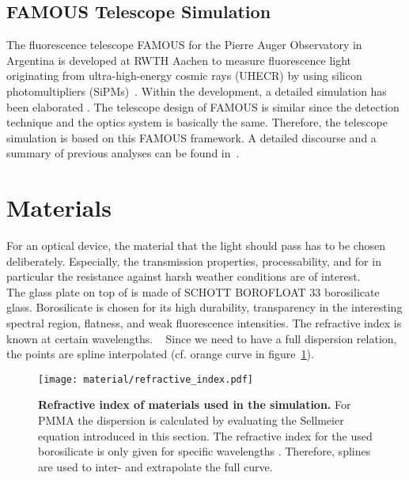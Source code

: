 \subsection{FAMOUS Telescope Simulation}\label{sec:famous_simulation}

The fluorescence telescope FAMOUS for the Pierre Auger Observatory in Argentina is developed at RWTH Aachen to measure fluorescence light originating from ultra-high-energy cosmic rays (UHECR) by using silicon photomultipliers (SiPMs)~\cite{famous:bretz}. Within the development, a detailed \geant simulation has been elaborated \cite{famous:sim_github,famous:sim_github}. The telescope design of FAMOUS is similar since the detection technique and the optics system is basically the same. Therefore, the \iceact telescope simulation is based on this FAMOUS \geant framework. A detailed discourse and a summary of previous analyses can be found in~\cite{famous:niggemann}.

\section{Materials}\label{sec:iceact:model:material}

For an optical device, the material that the light should pass has to be chosen deliberately. Especially, the transmission properties, processability, and for \iceact in particular the resistance against harsh weather conditions are of interest.\\

The glass plate on top of \iceact is made of SCHOTT BOROFLOAT\textsuperscript{\textregistered} 33 borosilicate glass. Borosilicate is chosen for its high durability, transparency in the interesting spectral region, flatness, and weak fluorescence intensities. The refractive index is known at certain wavelengths. ~\cite{iceact:borosilicate:datasheet} Since we need to have a full dispersion relation, the points are spline interpolated (cf. orange curve in figure~\ref{iceact:model:material:refractive_index}).\\

\begin{figure}[H]
	\centering
	\texttt{[image: material/refractive\_index.pdf]}
	\caption[Refractive index of used materials]{\textbf{Refractive index of materials used in the simulation.} For PMMA the dispersion is calculated by evaluating the Sellmeier equation introduced in this section. The refractive index for the used borosilicate is only given for specific wavelengths \cite{iceact:borosilicate:datasheet}. Therefore, splines are used to inter- and extrapolate the full curve.}
	\label{iceact:model:material:refractive_index}	
\end{figure}

